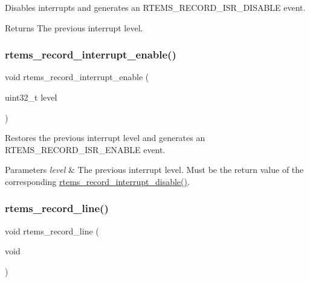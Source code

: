 Disables interrupts and generates an R\+T\+E\+M\+S\+\_\+\+R\+E\+C\+O\+R\+D\+\_\+\+I\+S\+R\+\_\+\+D\+I\+S\+A\+B\+LE event. 

\begin{DoxyReturn}{Returns}
The previous interrupt level. 
\end{DoxyReturn}
\mbox{\label{group__RTEMSRecord_gae2fc92f22a6875c0c95dd031ac26106b}} 
\subsubsection{\texorpdfstring{rtems\_record\_interrupt\_enable()}{rtems\_record\_interrupt\_enable()}}
{\footnotesize\ttfamily void rtems\+\_\+record\+\_\+interrupt\+\_\+enable (\begin{DoxyParamCaption}\item[{uint32\+\_\+t}]{level }\end{DoxyParamCaption})}



Restores the previous interrupt level and generates an R\+T\+E\+M\+S\+\_\+\+R\+E\+C\+O\+R\+D\+\_\+\+I\+S\+R\+\_\+\+E\+N\+A\+B\+LE event. 


\begin{DoxyParams}{Parameters}
{\em level} & The previous interrupt level. Must be the return value of the corresponding \mbox{\hyperlink{group__RTEMSRecord_ga95ef28ece3f724dd3c87055ad8b59176}{rtems\+\_\+record\+\_\+interrupt\+\_\+disable()}}. \\
\hline
\end{DoxyParams}
\mbox{\label{group__RTEMSRecord_gafeade04066a667db801ae71a60119c03}} 
\subsubsection{\texorpdfstring{rtems\_record\_line()}{rtems\_record\_line()}}
{\footnotesize\ttfamily void rtems\+\_\+record\+\_\+line (\begin{DoxyParamCaption}\item[{void}]{ }\end{DoxyParamCaption})}



